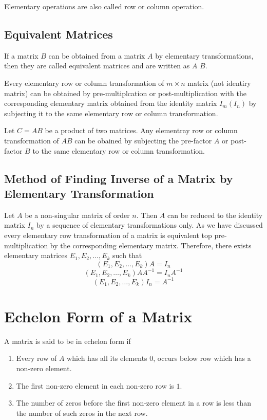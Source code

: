 Elementary operations are also called row or column operation.

\subsection{Equivalent Matrices}
If a matrix $B$ can be obtained from a matrix $A$ by elementary transformations, then they are called equivalent matrices and are
written as $A\text{~} B$.

Every elementary row or column transformation of $m\times n$ matrix (not identiry matrix) can be obtained by pre-multiplcation or
post-multiplication with the corresponding elementary matrix obtained from the identity matrix $I_m(I_n)$ by subjecting it to the
same elementary row or column transformation.

Let $C = AB$ be a product of two matrices. Any elementray row or column transformation of $AB$ can be obained by subjecting the
pre-factor $A$ or post-factor $B$ to the same elementary row or column transformation.

\subsection{Method of Finding Inverse of a Matrix by Elementary Transformation}
Let $A$ be a non-singular matrix of order $n$. Then $A$ can be reduced to the identity matrix $I_n$ by a sequence of elementary
transformations only. As we have discussed every elementary row transformation of a matrix is equivalent top pre-multiplication by
the corresponding elementary matrix. Therefore, there exists elementary matrices $E_1, E_2,\ldots, E_k$ such that
$$(E_1,E_2,\ldots, E_k)A = I_n$$
$$(E_1,E_2,\ldots, E_k)AA^{-1} = I_nA^{-1}$$
$$(E_1,E_2,\ldots, E_k)I_n = A^{-1}$$

\section{Echelon Form of a Matrix}
A matrix is said to be in echelon form if
\begin{enumerate}
\item Every row of $A$ which has all its elements $0$, occurs below row which has a non-zero element.
\item The first non-zero element in each non-zero row is $1$.
\item The number of zeros before the first non-zero element in a row is less than the number of such zeros in the next row.
\end{enumerate}

